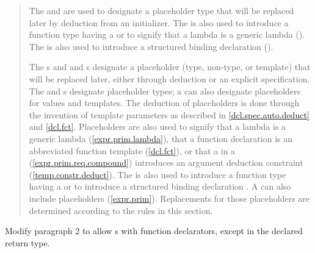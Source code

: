 \begin{quote}
\begin{removedblock}
\pnum
The  and  
are used to
designate a placeholder type that will be replaced later by deduction
from an initializer. The 
 is also used to
introduce a function type having a  or to
signify that a lambda is a generic lambda ().
The   is also used to introduce a
structured binding declaration ().
\end{removedblock}
\begin{addedblock}
The s  and 
and s designate a placeholder
(type, non-type, or template) that will be replaced later, either through 
deduction or an explicit specification.
%
The  and  s 
designate placeholder types; a  can 
also designate placeholders for values and templates. 
% 
\enternote
The deduction of placeholders is done through the invention of template
parameters as described in \ref{dcl.spec.auto.deduct} and \ref{dcl.fct}.
\exitnote
%
Placeholders are also used to signify that a lambda is a generic lambda 
(\ref{expr.prim.lambda}), that a function declaration is an
abbreviated function template (\ref{dcl.fct}), or that a 
 in a 
(\ref{expr.prim.req.compound}) introduces an argument deduction constraint 
(\ref{temp.constr.deduct}).
%
The   is also used to introduce a
function type having a  or to introduce
a structured binding declaration .
%
\enternote
A  can also include placeholders (\ref{expr.prim}).
Replacements for those placeholders are determined according to the rules
in this section.
\exitnote
% 
\end{addedblock}
\end{quote}

Modify paragraph 2 to allow s
with function declarators, except in the declared return type.

